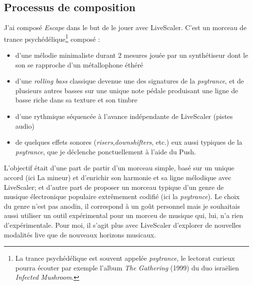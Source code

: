 \subsection{Processus de composition}
\begin{comment}
  Liste des contraintes :
\begin{enumerate}
  \item Toutes les pistes doivent être MIDI : une piste audio ne serait pas impactée par les changements de gamme
  \item Pauvreté harmonique : le morceau doit être relativement pauvre harmoniquement, idéalement rester sur le même accord tout le long.
\end{enumerate}
Préparation d'une session pour utiliser Live Scaler
\begin{enumerate}
  \item Passer toutes les pistes en MIDI (utiliser des sampleurs pour les pistes audio )
  \item S'assurer qu'on ne sort pas de la tessiture des instruments
  \item Mettre les synthétiseurs et sampleurs en mode legato au maximum.
\end{enumerate}
\end{comment}


J'ai composé \emph{Escape} dans le but de le jouer avec LiveScaler. C'est un morceau de trance psychédélique\footnote{La trance psychédélique est souvent  appelée \emph{psytrance}, le lectorat curieux pourra écouter par exemple l'album \emph{The Gathering} (1999) du duo israëlien \emph{Infected Mushroom}.} composé  : 
\begin{itemize}
  \item d'une mélodie minimaliste durant 2 mesures jouée par un synthétiseur  dont le son se rapproche d'un métallophone éthéré
  \item d'une \emph{rolling bass} classique devenue une des signatures de la \emph{psytrance}, et de plusieurs autres basses sur une unique note pédale produisant une ligne de basse riche dans sa texture et son timbre
  \item d'une rythmique séquencée à l'avance indépendante de LiveScaler (pistes audio)
  \item de quelques effets sonores (\emph{risers},\emph{downshifters}, etc.) eux aussi typiques de la \emph{psytrance}, que je déclenche ponctuellement à l'aide du Push.
\end{itemize}

L'objectif était d'une part de partir d'un morceau simple, basé sur un unique accord (ici La mineur) et d'enrichir son harmonie et sa ligne mélodique avec LiveScaler; et d'autre part de proposer un morceau typique d'un genre de musique électronique populaire extrêmement codifié (ici la \emph{psytrance}). Le choix du genre n'est pas anodin, il correspond à un goût personnel mais je souhaitais aussi utiliser un outil expérimental pour un morceu de musique qui, lui, n'a rien d'expérimentale. Pour moi, il s'agit plus avec LiveScaler d'explorer de nouvelles modalités live que de nouveaux horizons musicaux.

